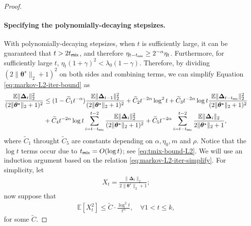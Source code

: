 \begin{proof}
\paragraph{Specifying the polynomially-decaying stepsizes.} With polynomially-decaying stepsizes, when $t$ is sufficiently large, it can be guaranteed that $t > 2t_{\mathsf{mix}}$, and therefore $\eta_{t-t_{\mathsf{mix}}} \geq 2^{-\alpha} \eta_t$. Furthermore, for sufficiently large $t$, $\eta_t (1+\gamma)^2 < \lambda_0(1-\gamma)$. Therefore, by dividing $(2\|\bm{\theta}^\star\|_2+1)^2$ on both sides and combining terms, we can simplify Equation \eqref{eq:markov-L2-iter-bound} as
\begin{align}\label{eq:markov-L2-iter-simplify}
\frac{\mathbb{E}\|\bm{\Delta}_{t}\|_2^2}{(2\|\bm{\theta}^\star\|_2+1)^2} &\leq (1-\widetilde{C}_1t^{-\alpha})\frac{\mathbb{E}\|\bm{\Delta}_{t-1}\|_2^2}{(2\|\bm{\theta}^\star\|_2+1)^2}  + \widetilde{C}_2 t^{-2\alpha}\log^2 t + \widetilde{C}_3 t^{-2\alpha} \log t \frac{\mathbb{E}\|\bm{\Delta}_{t-t_{\mathsf{mix}}}\|_2^2}{{(2\|\bm{\theta}^\star\|_2+1)^2} } \nonumber \\ 
&+ \widetilde{C}_4 t^{-2\alpha} \log t \sum_{i=t-t_{\mathsf{mix}}}^{t-2}\frac{\mathbb{E}\|\bm{\Delta}_i\|_2^2}{{(2\|\bm{\theta}^\star\|_2+1)^2} } + \widetilde{C}_5 t^{-2\alpha} \sum_{i=t-t_{\mathsf{mix}}}^{t-2}\frac{\mathbb{E}\|\bm{\Delta}_i\|_2}{2\|\bm{\theta}^\star\|_2+1} ,
\end{align}
where $\widetilde{C}_1$ throught $\widetilde{C}_5$ are constants depending on $\alpha,\eta_0,m$ and $\rho$. Notice that the $\log t$ terms occur due to $t_{\mathsf{mix}} = O(\log t)$; see \eqref{eq:tmix-bound-L2}. We will use an induction argument based on the relation \eqref{eq:markov-L2-iter-simplify}. For simplicity, let
\begin{align*}
X_t = \frac{\|\bm{\Delta}_t\|_2}{2\|\bm{\theta}^\star\|_2+1};
\end{align*}
now suppose that
\begin{align}\label{eq:markov-L2-induction-assumption}
\mathbb{E}[X_t^2] \leq \widetilde{C} \cdot \frac{\log^2 t}{t^{\alpha}}, \quad \forall 1 < t \leq k,
\end{align}
for some $\widetilde{C}$. 




\end{proof}
